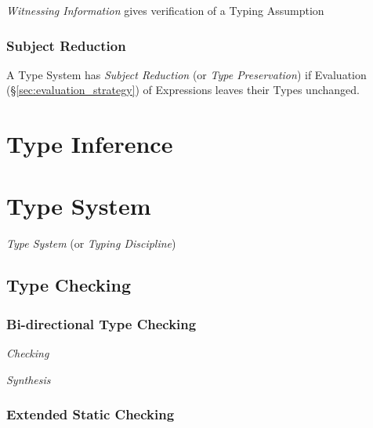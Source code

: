 \emph{Witnessing Information} gives verification of a Typing
Assumption



\subsubsection{Subject Reduction}\label{sec:subject_reduction}

A Type System has \emph{Subject Reduction} (or \emph{Type
  Preservation}) if Evaluation (\S\ref{sec:evaluation_strategy}) of
Expressions leaves their Types unchanged.



\section{Type Inference}\label{sec:type_inference}

\section{Type System}\label{sec:type_system}

\emph{Type System} (or \emph{Typing Discipline})



\subsection{Type Checking}\label{sec:type_checking}

\subsubsection{Bi-directional Type Checking}
\label{sec:bidirectional_checking}

\emph{Checking}

\emph{Synthesis}



\subsubsection{Extended Static Checking}\label{sec:extended_static}



